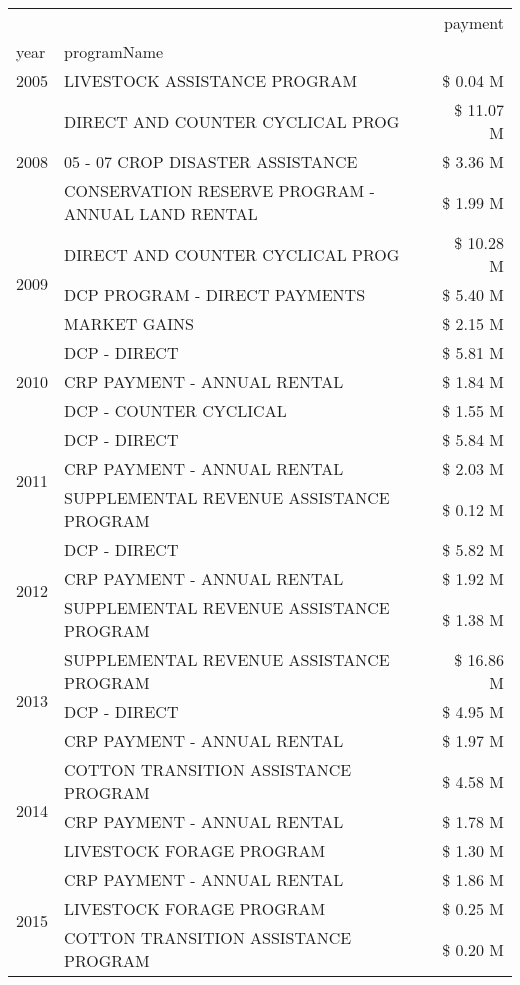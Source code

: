 \begin{tabular}{llr}
\toprule
 &  & payment \\
year & programName &  \\
\midrule
2005 & LIVESTOCK ASSISTANCE PROGRAM & \$ 0.04 M \\
\cline{1-3}
\multirow[t]{3}{*}{2008} & DIRECT AND COUNTER CYCLICAL PROG & \$ 11.07 M \\
 & 05 - 07 CROP DISASTER ASSISTANCE & \$ 3.36 M \\
 & CONSERVATION RESERVE PROGRAM - ANNUAL LAND RENTAL & \$ 1.99 M \\
\cline{1-3}
\multirow[t]{3}{*}{2009} & DIRECT AND COUNTER CYCLICAL PROG & \$ 10.28 M \\
 & DCP PROGRAM - DIRECT PAYMENTS & \$ 5.40 M \\
 & MARKET GAINS & \$ 2.15 M \\
\cline{1-3}
\multirow[t]{3}{*}{2010} & DCP - DIRECT & \$ 5.81 M \\
 & CRP PAYMENT - ANNUAL RENTAL & \$ 1.84 M \\
 & DCP - COUNTER CYCLICAL & \$ 1.55 M \\
\cline{1-3}
\multirow[t]{3}{*}{2011} & DCP - DIRECT & \$ 5.84 M \\
 & CRP PAYMENT - ANNUAL RENTAL & \$ 2.03 M \\
 & SUPPLEMENTAL REVENUE ASSISTANCE PROGRAM & \$ 0.12 M \\
\cline{1-3}
\multirow[t]{3}{*}{2012} & DCP - DIRECT & \$ 5.82 M \\
 & CRP PAYMENT - ANNUAL RENTAL & \$ 1.92 M \\
 & SUPPLEMENTAL REVENUE ASSISTANCE PROGRAM & \$ 1.38 M \\
\cline{1-3}
\multirow[t]{3}{*}{2013} & SUPPLEMENTAL REVENUE ASSISTANCE PROGRAM & \$ 16.86 M \\
 & DCP - DIRECT & \$ 4.95 M \\
 & CRP PAYMENT - ANNUAL RENTAL & \$ 1.97 M \\
\cline{1-3}
\multirow[t]{3}{*}{2014} & COTTON TRANSITION ASSISTANCE PROGRAM & \$ 4.58 M \\
 & CRP PAYMENT - ANNUAL RENTAL & \$ 1.78 M \\
 & LIVESTOCK FORAGE PROGRAM & \$ 1.30 M \\
\cline{1-3}
\multirow[t]{3}{*}{2015} & CRP PAYMENT - ANNUAL RENTAL & \$ 1.86 M \\
 & LIVESTOCK FORAGE PROGRAM & \$ 0.25 M \\
 & COTTON TRANSITION ASSISTANCE PROGRAM & \$ 0.20 M \\

\end{tabular}
